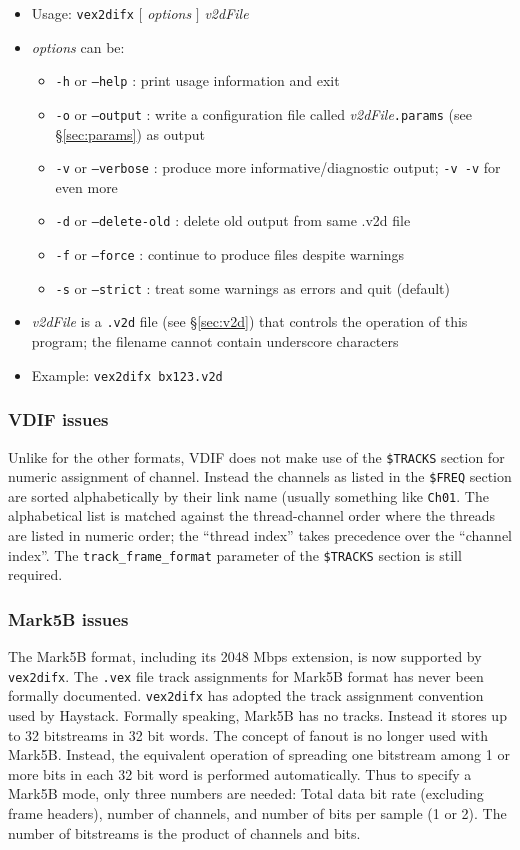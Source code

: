 \begin{itemize}
\item[] Usage: {\tt vex2difx} $[$ {\em options} $]$ {\em v2dFile}
\item[] {\em options} can be:
\begin{itemize}
\item[] {\tt -h} or {\tt --help} : print usage information and exit
\item[] {\tt -o} or {\tt --output} : write a configuration file called {\em v2dFile}{\tt .params} (see \S\ref{sec:params}) as output
\item[] {\tt -v} or {\tt --verbose} : produce more informative/diagnostic output; {\tt -v -v} for even more
\item[] {\tt -d} or {\tt --delete-old} : delete old output from same .v2d file
\item[] {\tt -f} or {\tt --force} : continue to produce files despite warnings
\item[] {\tt -s} or {\tt --strict} : treat some warnings as errors and quit (default)
\end{itemize}
\item[] {\em v2dFile} is a {\tt .v2d} file (see \S\ref{sec:v2d}) that controls the operation of this program; the filename cannot contain underscore characters
\item[] Example: {\tt vex2difx bx123.v2d}
\end{itemize}

\subsubsection{VDIF issues}

Unlike for the other formats, VDIF does not make use of the {\tt \$TRACKS} section for numeric assignment of channel.
Instead the channels as listed in the {\tt \$FREQ} section are sorted alphabetically by their link name (usually something like {\tt Ch01}.
The alphabetical list is matched against the thread-channel order where the threads are listed in numeric order; the ``thread index'' takes precedence over the ``channel index''.
The {\tt track\_frame\_format} parameter of the {\tt \$TRACKS} section is still required.

\subsubsection{Mark5B issues}

The Mark5B format, including its 2048 Mbps extension, is now supported by {\tt vex2difx}. 
The {\tt .vex} file track assignments for Mark5B format has never been formally documented.
{\tt vex2difx} has adopted the track assignment convention used by Haystack. 
Formally speaking, Mark5B has no tracks. 
Instead it stores up to 32 bitstreams in 32 bit words. 
The concept of fanout is no longer used with Mark5B. 
Instead, the equivalent operation of spreading one bitstream among 1 or more bits in each 32 bit word is performed automatically. 
Thus to specify a Mark5B mode, only three numbers are needed: Total data bit rate (excluding frame headers), number of channels, and number of bits per sample (1 or 2). 
The number of bitstreams is the product of channels and bits.

